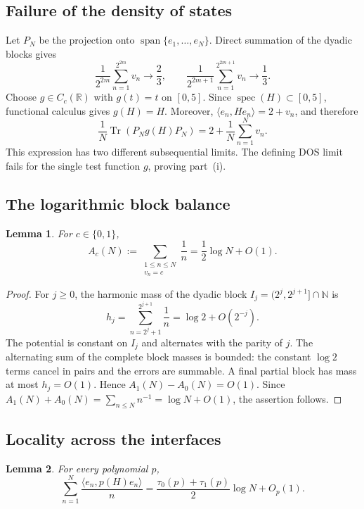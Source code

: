 \documentclass[11pt]{article}
\newtheorem{lemma}{Lemma}
\newcommand{\N}{\mathbb N}
\newcommand{\R}{\mathbb R}
\newcommand{\Tr}{\operatorname{Tr}}
\newcommand{\spec}{\operatorname{spec}}
\newcommand{\ip}[2]{\langle #1,#2\rangle}
\begin{document}
\subsection{Failure of the density of states}

Let $P_N$ be the projection onto
$\operatorname{span}\{e_1,\ldots,e_N\}$.  Direct summation of the dyadic
blocks gives
\[
 \frac1{2^{2m}}\sum_{n=1}^{2^{2m}}v_n\longrightarrow\frac23,
 \qquad
 \frac1{2^{2m+1}}\sum_{n=1}^{2^{2m+1}}v_n\longrightarrow\frac13.
\]
Choose $g\in C_c(\R)$ with $g(t)=t$ on $[0,5]$.  Since
$\spec(H)\subset[0,5]$, functional calculus gives $g(H)=H$.  Moreover,
$\ip{e_n}{He_n}=2+v_n$, and therefore
\[
 \frac1N\Tr(P_Ng(H)P_N)=2+\frac1N\sum_{n=1}^Nv_n.
\]
This expression has two different subsequential limits.  The defining DOS
limit fails for the single test function $g$, proving part~\textup{(i)}.

\subsection{The logarithmic block balance}

\begin{lemma}\label{lem:block}
For $c\in\{0,1\}$,
\[
 A_c(N):=\sum_{\substack{1\leq n\leq N\\v_n=c}}\frac1n
 =\frac12\log N+O(1).
\]
\end{lemma}

\begin{proof}
For $j\geq0$, the harmonic mass of the dyadic block
$I_j=(2^j,2^{j+1}]\cap\N$ is
\[
 h_j=\sum_{n=2^j+1}^{2^{j+1}}\frac1n=\log2+O(2^{-j}).
\]
The potential is constant on $I_j$ and alternates with the parity of $j$.
The alternating sum of the complete block masses is bounded: the constant
$\log2$ terms cancel in pairs and the errors are summable.  A final partial
block has mass at most $h_j=O(1)$.  Hence $A_1(N)-A_0(N)=O(1)$.  Since
$A_1(N)+A_0(N)=\sum_{n\leq N}n^{-1}=\log N+O(1)$, the assertion follows.
\end{proof}

\subsection{Locality across the interfaces}

\begin{lemma}\label{lem:poly}
For every polynomial $p$,
\[
 \sum_{n=1}^N\frac{\ip{e_n}{p(H)e_n}}n
 =\frac{\tau_0(p)+\tau_1(p)}2\log N+O_p(1).
\]
\end{lemma}
\end{document}
